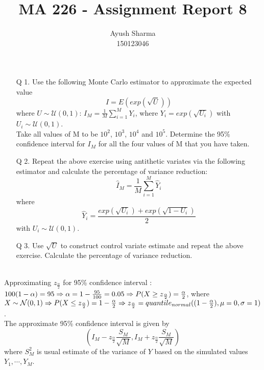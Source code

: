 \documentclass[11pt]{article}
\title{MA 226 - Assignment Report 8}
\author{Ayush Sharma\\150123046}
\begin{document}
\titlepage
\newpage
\begin{enumerate}
\item[Q 1.] Use the following Monte Carlo estimator to approximate the expected value $$I = E(exp(\sqrt{U}))$$ where $U \sim \mathcal{U}(0,1)$: $I_M = \frac{1}{M}\sum_{i=1}^{M}Y_{i}$, where $Y_i = exp(\sqrt{U_i})$ with $U_i \sim \mathcal{U}(0,1)$.\\
Take all values of M to be $10^2$, $10^3$, $10^4$ and $10^5$. Determine the 95\% confidence interval for $I_M$ for all the four values of M that you have taken.

\item[Q 2.] Repeat the above exercise using antithetic variates via the following estimator and calculate the percentage of variance reduction:
$$\hat{I}_{M} = \frac{1}{M}\sum_{i=1}^{M}\hat{Y}_{i}$$ where $$\hat{Y}_{i} = \frac{exp(\sqrt{U_i}) + exp(\sqrt{1 - U_i})}{2}$$ with $U_i \sim \mathcal{U}(0,1)$.

\item[Q 3.] Use $\sqrt{U}$ to construct control variate estimate and repeat the above exercise. Calculate the percentage of variance reduction.
\end{enumerate}
\newpage
{}\\
Approximating $z_{\frac{\alpha}{2}}$ for 95\% confidence interval :\\
$100(1-\alpha) = 95 \Rightarrow \alpha = 1 - \frac{95}{100} = 0.05\\
\Rightarrow P(X \geq z_{\frac{\alpha}{2}}) = \frac{\alpha}{2}$, where $ X \sim \mathcal{N}(0,1)\\
\Rightarrow P(X \leq z_{\frac{\alpha}{2}}) = 1 - \frac{\alpha}{2}\\
\Rightarrow z_{\frac{\alpha}{2}} = quantile_{normal}((1 - \frac{\alpha}{2}), \mu = 0, \sigma = 1)$.\\

The approximate 95\% confidence interval is given by
$$(I_M - z_{\frac{\alpha}{2}}\frac{S_M}{\sqrt{M}} , I_M + z_{\frac{\alpha}{2}}\frac{S_M}{\sqrt{M}})$$
where $S_{M}^{2}$ is usual estimate of the variance of $Y$ based on the simulated values $Y_1, \cdots , Y_M$.\\
\end{document}
